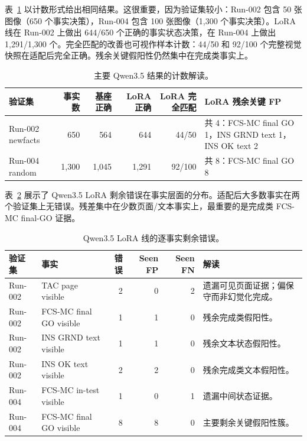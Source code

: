 表~\ref{tab:qwen35-counts} 以计数形式给出相同结果。这很重要，因为验证集较小：Run-002 包含 50 张图像（650 个事实决策），Run-004 包含 100 张图像（1,300 个事实决策）。LoRA 线在 Run-002 上做出 644/650 个正确的事实状态决策，在 Run-004 上做出 1,291/1,300 个。完全匹配的改善也可视作样本计数：44/50 和 92/100 个完整视觉快照在适配后完全正确。残余关键假阳性仍然集中在完成类事实上。

\begin{table}[htbp]
\centering
\caption{主要 Qwen3.5 结果的计数解读。}
\label{tab:qwen35-counts}
\small
\begin{tabularx}{\textwidth}{@{}lrrrrX@{}}
\toprule
\textbf{验证集} & \textbf{事实数} & \textbf{基座正确} & \textbf{LoRA 正确} & \textbf{LoRA 完全匹配} & \textbf{LoRA 残余关键 FP} \\
\midrule
Run-002 newfacts & 650 & 564 & 644 & 44/50 & 共 4：FCS-MC final GO 1，INS GRND text 1，INS OK text 2 \\
Run-004 random & 1,300 & 1,045 & 1,291 & 92/100 & 共 8：FCS-MC final GO 8 \\
\bottomrule
\end{tabularx}
\end{table}

表~\ref{tab:qwen35-residual-facts} 展示了 Qwen3.5 LoRA 剩余错误在事实层面的分布。适配后大多数事实在两个验证集上无错误。残差集中在少数页面/文本事实上，最重要的是完成类 FCS-MC final-GO 证据。

\begin{table}[htbp]
\centering
\caption{Qwen3.5 LoRA 线的逐事实剩余错误。}
\label{tab:qwen35-residual-facts}
\small
\begin{tabularx}{\textwidth}{@{}llrrrX@{}}
\toprule
\textbf{验证集} & \textbf{事实} & \textbf{错误} & \textbf{Seen FP} & \textbf{Seen FN} & \textbf{解读} \\
\midrule
Run-002 & TAC page visible & 2 & 0 & 2 & 遗漏可见页面证据；偏保守而非幻觉化完成。 \\
Run-002 & FCS-MC final GO visible & 1 & 1 & 0 & 残余完成类假阳性。 \\
Run-002 & INS GRND text visible & 1 & 1 & 0 & 残余文本状态假阳性。 \\
Run-002 & INS OK text visible & 2 & 2 & 0 & 残余完成类文本假阳性。 \\
Run-004 & FCS-MC in-test visible & 1 & 0 & 1 & 遗漏中间状态证据。 \\
Run-004 & FCS-MC final GO visible & 8 & 8 & 0 & 主要剩余关键假阳性簇。 \\
\bottomrule
\end{tabularx}
\end{table}

